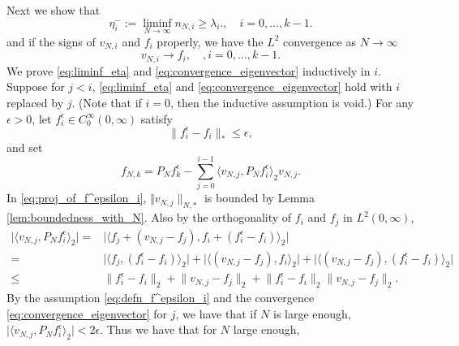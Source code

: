 \documentclass[11pt, a4paper]{article}
\numberwithin{equation}{section}
\theoremstyle{definition}
\theoremstyle{remark}
\begin{document}
Next we show that
\begin{equation} \label{eq:liminf_eta}
  \eta^-_i := \liminf_{N \to \infty} n_{N, i} \geq \lambda_i., \quad i = 0, \dotsc, k - 1.
\end{equation}
and if the signs of $v_{N, i}$ and $f_i$ properly, we have the $L^2$ convergence as $N \to \infty$
\begin{equation} \label{eq:convergence_eigenvector}
  v_{N, i} \to f_i, \quad, i = 0, \dotsc, k - 1.
\end{equation}
We prove \eqref{eq:liminf_eta} and \eqref{eq:convergence_eigenvector} inductively in $i$. Suppose for $j < i$, \eqref{eq:liminf_eta} and \eqref{eq:convergence_eigenvector} hold with $i$ replaced by $j$. (Note that if $i = 0$, then the inductive assumption is void.) For any $\epsilon > 0$, let $f^{\epsilon}_i \in C^{\infty}_0(0, \infty)$ satisfy
\begin{equation} \label{eq:defn_f^epsilon_i}
  \lVert f^{\epsilon}_i - f_i \rVert_* \leq \epsilon,
\end{equation}
and set
\begin{equation} \label{eq:proj_of_f^epsilon_i}
  f_{N, k} = P_N f^{\epsilon}_k - \sum^{i - 1}_{j = 0} \langle v_{N, j}, P_N f^{\epsilon}_i \rangle_2 v_{N, j}.
\end{equation}
In \eqref{eq:proj_of_f^epsilon_i}, $\Vert v_{N, j} \rVert_{N, *}$ is bounded by Lemma \ref{lem:boundedness_with_N}. Also by the orthogonality of $f_i$ and $f_j$ in $L^2(0, \infty)$,
\begin{equation}
  \begin{split}
    \lvert \langle v_{N, j}, P_N f^{\epsilon}_i \rangle_2 \rvert = {}& \lvert \langle f_j + (v_{N, j} - f_j), f_i + (f^{\epsilon}_i - f_i) \rangle_2 \rvert \\
    = {}& \lvert \langle f_j, (f^{\epsilon}_i - f_i) \rangle_2 \rvert + \lvert \langle (v_{N, j} - f_j), f_i \rangle_2 \rvert + \lvert \langle (v_{N, j} - f_j), (f^{\epsilon}_i - f_i) \rangle_2 \rvert \\
    \leq {}& \lVert f^{\epsilon}_i - f_i \rVert_2 + \lVert v_{N, j} - f_j \rVert_2 + \lVert f^{\epsilon}_i - f_i \rVert_2 \lVert v_{N, j} - f_j \rVert_2.
  \end{split}
\end{equation}
By the assumption \ref{eq:defn_f^epsilon_i} and the convergence \eqref{eq:convergence_eigenvector} for $j$, we have that if $N$ is large enough, $\lvert \langle v_{N, j}, P_N f^{\epsilon}_i \rangle_2 \rvert < 2\epsilon$. Thus we have that for $N$ large enough,
\end{document}
